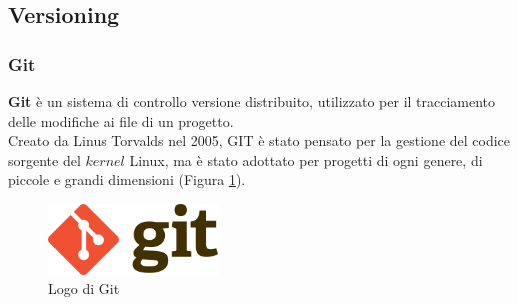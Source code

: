 \subsection{Versioning}
\subsubsection{Git}
\textbf{Git} è un sistema di controllo versione distribuito, utilizzato per il tracciamento delle modifiche ai file di un progetto.\\ 
Creato da Linus Torvalds nel 2005, GIT è stato pensato per la gestione del codice sorgente del $kernel$ Linux, ma è stato adottato 
per progetti di ogni genere, di piccole e grandi dimensioni (Figura \ref{fig:git}).\\
\begin{figure}[h]
    \centering
    \includegraphics[width=0.4\textwidth]{images/tecnologie/logo_git.png}
    \caption{Logo di Git}
    \label{fig:git}
\end{figure}

